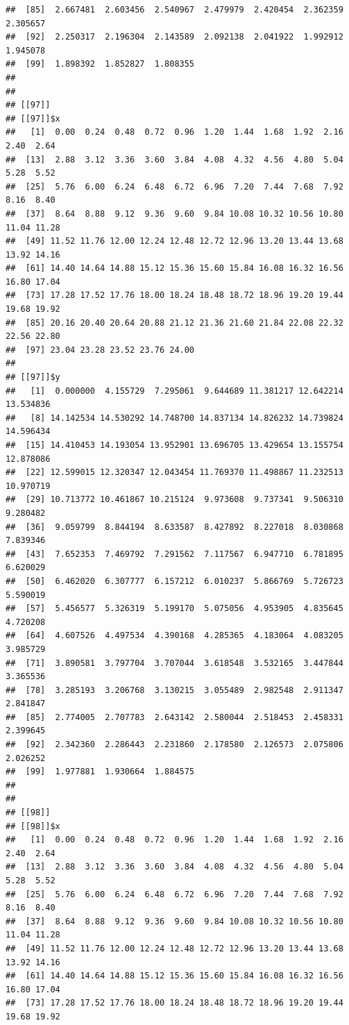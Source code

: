 \documentclass[
  ignorenonframetext,
]{beamer}
\begin{document}
\begin{frame}[fragile]{}
\begin{verbatim}
##  [85]  2.667481  2.603456  2.540967  2.479979  2.420454  2.362359  2.305657
##  [92]  2.250317  2.196304  2.143589  2.092138  2.041922  1.992912  1.945078
##  [99]  1.898392  1.852827  1.808355
## 
## 
## [[97]]
## [[97]]$x
##   [1]  0.00  0.24  0.48  0.72  0.96  1.20  1.44  1.68  1.92  2.16  2.40  2.64
##  [13]  2.88  3.12  3.36  3.60  3.84  4.08  4.32  4.56  4.80  5.04  5.28  5.52
##  [25]  5.76  6.00  6.24  6.48  6.72  6.96  7.20  7.44  7.68  7.92  8.16  8.40
##  [37]  8.64  8.88  9.12  9.36  9.60  9.84 10.08 10.32 10.56 10.80 11.04 11.28
##  [49] 11.52 11.76 12.00 12.24 12.48 12.72 12.96 13.20 13.44 13.68 13.92 14.16
##  [61] 14.40 14.64 14.88 15.12 15.36 15.60 15.84 16.08 16.32 16.56 16.80 17.04
##  [73] 17.28 17.52 17.76 18.00 18.24 18.48 18.72 18.96 19.20 19.44 19.68 19.92
##  [85] 20.16 20.40 20.64 20.88 21.12 21.36 21.60 21.84 22.08 22.32 22.56 22.80
##  [97] 23.04 23.28 23.52 23.76 24.00
## 
## [[97]]$y
##   [1]  0.000000  4.155729  7.295061  9.644689 11.381217 12.642214 13.534836
##   [8] 14.142534 14.530292 14.748700 14.837134 14.826232 14.739824 14.596434
##  [15] 14.410453 14.193054 13.952901 13.696705 13.429654 13.155754 12.878086
##  [22] 12.599015 12.320347 12.043454 11.769370 11.498867 11.232513 10.970719
##  [29] 10.713772 10.461867 10.215124  9.973608  9.737341  9.506310  9.280482
##  [36]  9.059799  8.844194  8.633587  8.427892  8.227018  8.030868  7.839346
##  [43]  7.652353  7.469792  7.291562  7.117567  6.947710  6.781895  6.620029
##  [50]  6.462020  6.307777  6.157212  6.010237  5.866769  5.726723  5.590019
##  [57]  5.456577  5.326319  5.199170  5.075056  4.953905  4.835645  4.720208
##  [64]  4.607526  4.497534  4.390168  4.285365  4.183064  4.083205  3.985729
##  [71]  3.890581  3.797704  3.707044  3.618548  3.532165  3.447844  3.365536
##  [78]  3.285193  3.206768  3.130215  3.055489  2.982548  2.911347  2.841847
##  [85]  2.774005  2.707783  2.643142  2.580044  2.518453  2.458331  2.399645
##  [92]  2.342360  2.286443  2.231860  2.178580  2.126573  2.075806  2.026252
##  [99]  1.977881  1.930664  1.884575
## 
## 
## [[98]]
## [[98]]$x
##   [1]  0.00  0.24  0.48  0.72  0.96  1.20  1.44  1.68  1.92  2.16  2.40  2.64
##  [13]  2.88  3.12  3.36  3.60  3.84  4.08  4.32  4.56  4.80  5.04  5.28  5.52
##  [25]  5.76  6.00  6.24  6.48  6.72  6.96  7.20  7.44  7.68  7.92  8.16  8.40
##  [37]  8.64  8.88  9.12  9.36  9.60  9.84 10.08 10.32 10.56 10.80 11.04 11.28
##  [49] 11.52 11.76 12.00 12.24 12.48 12.72 12.96 13.20 13.44 13.68 13.92 14.16
##  [61] 14.40 14.64 14.88 15.12 15.36 15.60 15.84 16.08 16.32 16.56 16.80 17.04
##  [73] 17.28 17.52 17.76 18.00 18.24 18.48 18.72 18.96 19.20 19.44 19.68 19.92

\end{verbatim}
\end{frame}
\end{document}
